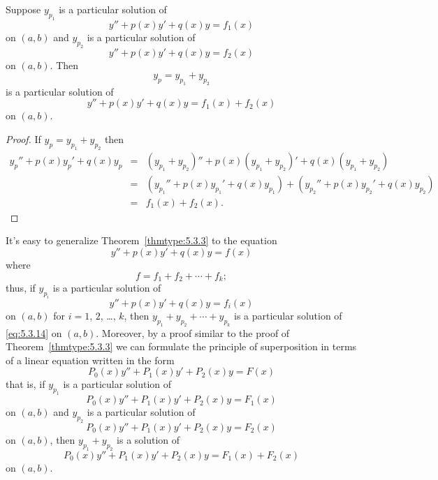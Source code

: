 \documentclass{ximera}
\begin{document}
\begin{theorem}
\label{thmtype:5.3.3}
Suppose  $y_{p_1}$ is a particular solution of
$$
y''+p(x)y'+q(x)y=f_1(x)
$$
on $(a,b)$ and $y_{p_2}$ is a particular solution of
$$
y''+p(x)y'+q(x)y=f_2(x)
$$
on   $(a,b)$.
 Then
$$
y_p=y_{p_1}+y_{p_2}
$$
is a particular  solution of
$$
y''+p(x)y'+q(x)y=f_1(x)+f_2(x)
$$
on  $(a,b)$.
\end{theorem}
 
\begin{proof} If $y_p=y_{p_1}+y_{p_2}$ then
\begin{eqnarray*}
y_p''+p(x)y_p'+q(x)y_p&=&(y_{p_1}+y_{p_2})''+p(x)(y_{p_1}+y_{p_2})'
+q(x)(y_{p_1}+y_{p_2})\\
&=&\left(y_{p_1}''+p(x)y_{p_1}'+q(x)y_{p_1}\right)
+\left(y_{p_2}''+p(x)y_{p_2}'+q(x)y_{p_2}\right)\\
&=&f_1(x)+f_2(x).
\end{eqnarray*}
\end{proof}
 
 
It's easy to generalize  Theorem~\ref{thmtype:5.3.3}
to the equation
\begin{equation} \label{eq:5.3.14}
y''+p(x)y'+q(x)y=f(x)
\end{equation}
where
$$
f=f_1+f_2+\cdots+f_k;
$$
thus, if $y_{p_i}$ is a particular solution of
$$
y''+p(x)y'+q(x)y=f_i(x)
$$
on $(a,b)$ for $i=1$, $2$, \dots, $k$, then
$y_{p_1}+y_{p_2}+\cdots+y_{p_k}$
is a particular solution of \eqref{eq:5.3.14} on $(a,b)$. Moreover, by a
proof similar to the proof of Theorem~\ref{thmtype:5.3.3} we can formulate
the principle of superposition in terms of a linear equation written
in the form
$$
P_0(x)y''+P_1(x)y'+P_2(x)y=F(x)
$$
   that is, if $y_{p_1}$
is a particular solution of
$$
P_0(x)y''+P_1(x)y'+P_2(x)y=F_1(x)
$$
on $(a,b)$ and $y_{p_2}$ is a particular solution of
$$
P_0(x)y''+P_1(x)y'+P_2(x)y=F_2(x)
$$
on  $(a,b)$, then $y_{p_1}+y_{p_2}$ is a solution of
$$
P_0(x)y''+P_1(x)y'+P_2(x)y=F_1(x)+F_2(x)
$$
on $(a,b)$.
 
\end{document}

